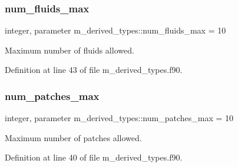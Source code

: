 \subsubsection{\texorpdfstring{num\+\_\+fluids\+\_\+max}{num\_fluids\_max}}
{\footnotesize\ttfamily integer, parameter m\+\_\+derived\+\_\+types\+::num\+\_\+fluids\+\_\+max = 10}



Maximum number of fluids allowed. 



Definition at line 43 of file m\+\_\+derived\+\_\+types.\+f90.

\mbox{\label{namespacem__derived__types_a0e61503f10c4338737b8d61e9109e396}} 
\subsubsection{\texorpdfstring{num\+\_\+patches\+\_\+max}{num\_patches\_max}}
{\footnotesize\ttfamily integer, parameter m\+\_\+derived\+\_\+types\+::num\+\_\+patches\+\_\+max = 10}



Maximum number of patches allowed. 



Definition at line 40 of file m\+\_\+derived\+\_\+types.\+f90.

